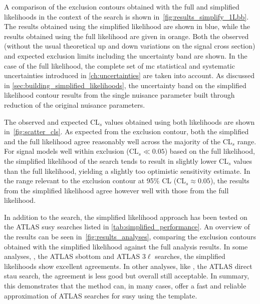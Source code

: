 A comparison of the exclusion contours obtained with the full and simplified likelihoods in the context of the \onelepton search is shown in~\cref{fig:results_simplify_1Lbb}. The results obtained using the simplified likelihood are shown in blue, while the results obtained using the full likelihood are given in orange. Both the observed (without the usual theoretical up and down variations on the signal cross section) and expected exclusion limits including the uncertainty band are shown. In the case of the full likelihood, the complete set of \gls{mc} statistical and systematic uncertainties introduced in \cref{ch:uncertainties} are taken into account. As discussed in \cref{sec:building_simplified_likelihoods}, the uncertainty band on the simplified likelihood contour results from the single nuisance parameter built through reduction of the original nuisance parameters.

The observed and expected CL$_s$ values obtained using both likelihoods are shown in~\cref{fig:scatter_cls}. As expected from the exclusion contour, both the simplified and the full likelihood agree reasonably well across the majority of the CL$_s$ range. For signal models well within exclusion ($\mathrm{CL}_s \ll 0.05$) based on the full likelihood, the simplified likelihood of the \onelepton search tends to result in slightly lower CL$_s$ values than the full likelihood, yielding a slightly too optimistic sensitivity estimate. In the range relevant to the exclusion contour at 95\% CL (CL$_s\approx0.05$), the results from the simplified likelihood agree however well with those from the full likelihood.

In addition to the \onelepton search, the simplified likelihood approach has been tested on the ATLAS \gls{susy} searches listed in \cref{tab:simplified_performance}. An overview of the results can be seen in~\cref{fig:results_analyses}, comparing the exclusion contours obtained with the simplified likelihood against the full analysis results. In some analyses, \eg, the ATLAS sbottom  and ATLAS $3\ell$ searches, the simplified likelihoods show excellent agreements. In other analyses, like \eg, the ATLAS direct stau search, the agreement is less good but overall still acceptable.
In summary, this demonstrates that the method can, in many cases, offer a fast and reliable approximation of ATLAS searches for \gls{susy} using the  template.

